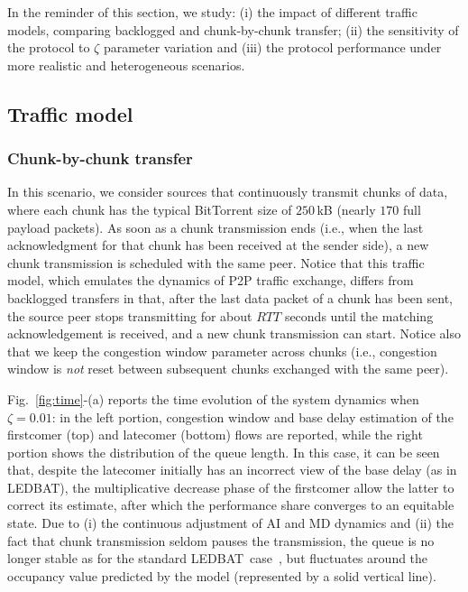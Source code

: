 \documentclass[conference]{IEEEtran}
\newcommand{\figR}[1]{Fig.~\ref{fig:#1}}
\newcommand{\btledbat}[0]{LEDBAT}
\begin{document}
In the reminder of this section, we study: (i) the impact of different traffic models, comparing backlogged and chunk-by-chunk transfer; (ii) the sensitivity of the protocol to $\zeta$ parameter variation and (iii) the protocol performance under more realistic and heterogeneous scenarios.

\subsection{Traffic model}

\subsubsection{Chunk-by-chunk transfer}

In this scenario, we consider sources that continuously transmit chunks of
data, where each chunk has the typical BitTorrent size of $250$\,kB (nearly $170$ full payload packets). As soon as a chunk transmission ends (i.e., when the last acknowledgment for that chunk has been received at the sender side), a new chunk transmission is scheduled with the same peer. Notice that this traffic model, which emulates the dynamics of P2P traffic exchange, differs from backlogged transfers in that,
after the last data packet of a chunk has been sent, the source peer stops transmitting for about $RTT$ seconds until the matching acknowledgement is received, and a new chunk transmission can start. Notice also that we keep the congestion window parameter
across chunks (i.e., congestion window is \emph{not} reset between subsequent chunks exchanged with the same peer).



\figR{time}-(a) reports the time evolution of the system dynamics when $\zeta=0.01$: in the left portion, congestion window and base delay estimation of the firstcomer (top) and latecomer (bottom) flows are reported, while the right portion shows the  distribution of the queue length. In this case, it can be seen that, despite the latecomer initially has an incorrect view of the base delay (as in \btledbat), the multiplicative decrease phase of the firstcomer allow the latter to correct its estimate, after which the performance share converges to an equitable state. Due to (i) the continuous adjustment of AI and MD dynamics and (ii) the fact that chunk transmission seldom pauses the transmission, the queue is no longer stable as for the standard \btledbat\ case~\cite{icccn10}, but fluctuates around the occupancy value predicted by the model (represented by a solid vertical line).
\end{document}
